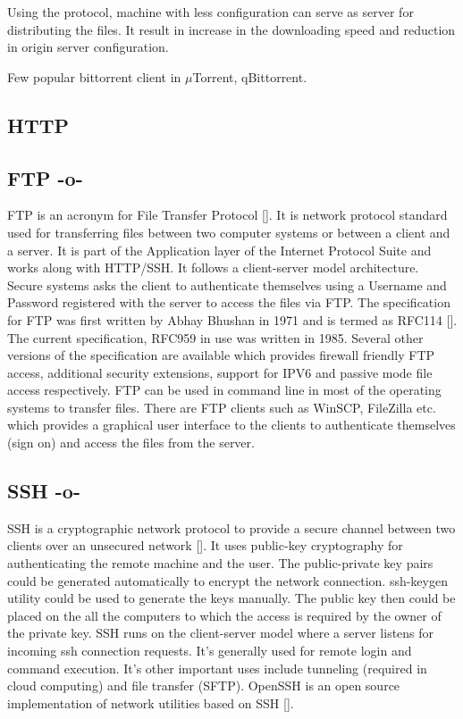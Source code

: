 Using the protocol, machine with less configuration can serve as
server for distributing the files. It result in increase in the
downloading speed and reduction in origin server configuration.

Few popular bittorrent client in $\mu$Torrent, qBittorrent.



\subsection{HTTP}
\subsection{FTP -o-}

FTP is an acronym for File Transfer Protocol [\cite{www-ftp-wiki}]. It
is network protocol standard used for transferring files between two
computer systems or between a client and a server. It is part of the
Application layer of the Internet Protocol Suite and works along with
HTTP/SSH. It follows a client-server model architecture. Secure
systems asks the client to authenticate themselves using a Username
and Password registered with the server to access the files via
FTP. The specification for FTP was first written by Abhay Bhushan in
1971 and is termed as RFC114 [\cite{www-rfc114}]. The current
specification, RFC959 in use was written in 1985. Several other
versions of the specification are available which provides firewall
friendly FTP access, additional security extensions, support for IPV6
and passive mode file access respectively. FTP can be used in command
line in most of the operating systems to transfer files. There are FTP
clients such as WinSCP, FileZilla etc. which provides a graphical user
interface to the clients to authenticate themselves (sign on) and
access the files from the server.


     
\subsection{SSH -o-}

SSH is a cryptographic network protocol to provide a secure channel
between two clients over an unsecured network [\cite{www-ssh-wiki}]. It
uses public-key cryptography for authenticating the remote machine and
the user. The public-private key pairs could be generated
automatically to encrypt the network connection.  ssh-keygen utility
could be used to generate the keys manually.  The public key then
could be placed on the all the computers to which the access is
required by the owner of the private key.  SSH runs on the
client-server model where a server listens for incoming ssh connection
requests. It's generally used for remote login and command
execution. It's other important uses include tunneling (required in
cloud computing) and file transfer (SFTP).  OpenSSH is an open source
implementation of network utilities based on
SSH [\cite{www-openssh-wiki}].




